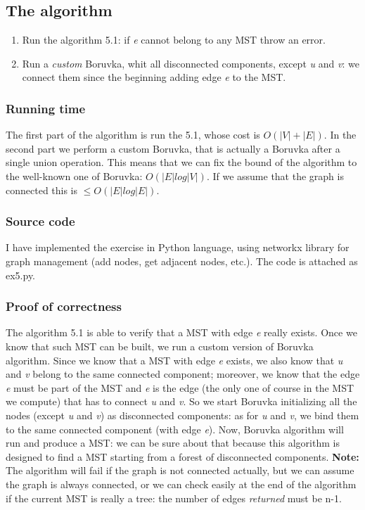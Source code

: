 \documentclass[12pt]{article}
\begin{document}
\subsection{The algorithm}
\begin{enumerate}
	\item Run the algorithm 5.1: if \textit{e} cannot belong to any MST throw an error.
	\item Run a \textit{custom} Boruvka, whit all disconnected components, except \textit{u} and \textit{v}: we connect them since the beginning adding edge \textit{e} to the MST.
\end{enumerate}

\subsubsection{Running time}
The first part of the algorithm is run the 5.1, whose cost is $O(|V| + |E|)$. In the second part we perform a custom Boruvka, that is actually a Boruvka after a single union operation. This means that we can fix the bound of the algorithm to the well-known one of Boruvka: $O(|E| log|V|)$. If we assume that the graph is connected this is $\leq O(|E| log|E|)$.

\subsubsection{Source code}
I have implemented the exercise in Python language, using networkx library for graph management (add nodes, get adjacent nodes, etc.). The code is attached as ex5.py.

\subsubsection{Proof of correctness}
The algorithm 5.1 is able to verify that a MST with edge \textit{e} really exists. Once we know that such MST can be built, we run a custom version of Boruvka algorithm. Since we know that a MST with edge \textit{e} exists, we also know that \textit{u} and \textit{v} belong to the same connected component; moreover, we know that the edge \textit{e} must be part of the MST and \textit{e} is the edge (the only one of course in the MST we compute) that has to connect \textit{u} and \textit{v}. So we start Boruvka initializing all the nodes (except \textit{u} and \textit{v}) as disconnected components: as for \textit{u} and \textit{v}, we bind them to the same connected component (with edge \textit{e}). Now, Boruvka algorithm will run and produce a MST: we can be sure about that because this algorithm is designed to find a MST starting from a forest of disconnected components. \textbf{Note:} The algorithm will fail if the graph is not connected actually, but we can assume the graph is always connected, or we can check easily at the end of the algorithm if the current MST is really a tree: the number of edges \textit{returned} must be n-1. 
\end{document}
